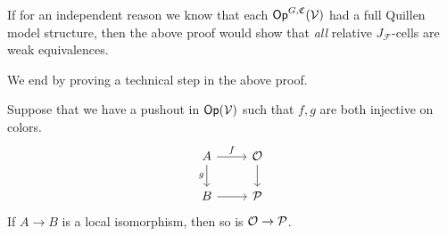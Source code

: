 \documentclass[a4paper,10pt
,draft
]{article}%
\renewcommand{\F}{\mathcal F}
\renewcommand{\1}{\eta}%
\begin{document}
\begin{remark}
      \label{OPGCV_F_JC_REM}
      If for an independent reason we know that each $\mathsf{Op}^{G, \mathfrak C}(\mathcal V)$ had a full Quillen model structure,
      then the above proof would show that \textit{all} relative $J_\F$-cells are weak equivalences.
\end{remark}







We end by proving a technical step in the above proof.
\begin{lemma}
      \label{LOCALISO_LEM}
      Suppose that we have a pushout in $\mathsf{Op}(\mathcal V)$ such that $f,g$ are both injective on colors.
      \[
            \begin{tikzcd}
                  A \arrow[d, "g"'] \arrow[r, "f"]
                  &
                  \O \arrow[d]
                  \\
                  B \arrow[r]
                  &
                  \P
            \end{tikzcd}
      \]
      If $A \to B$ is a local isomorphism, then so is $\mathcal{O} \to \mathcal{P}$.
\end{lemma}
\end{document}
